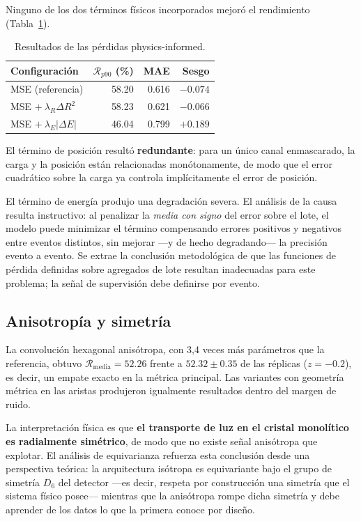 Ninguno de los dos términos físicos incorporados mejoró el rendimiento
(Tabla~\ref{tab:res-loss}).

\begin{table}[htbp]
\centering
\caption{Resultados de las pérdidas physics-informed.}
\label{tab:res-loss}
\begin{tabular}{lrrr}
\toprule
\textbf{Configuración} & $\mathcal{R}_{p90}$ (\%) & \textbf{MAE} & \textbf{Sesgo} \\
\midrule
MSE (referencia) & 58.20 & 0.616 & $-0.074$ \\
MSE $+\ \lambda_R \Delta R^2$ & 58.23 & 0.621 & $-0.066$ \\
MSE $+\ \lambda_E |\Delta E|$ & 46.04 & 0.799 & $+0.189$ \\
\bottomrule
\end{tabular}
\end{table}

El término de posición resultó \textbf{redundante}: para un único canal enmascarado, la carga y la
posición están relacionadas monótonamente, de modo que el error cuadrático sobre la carga ya
controla implícitamente el error de posición.

El término de energía produjo una degradación severa. El análisis de la causa resulta instructivo:
al penalizar la \emph{media con signo} del error sobre el lote, el modelo puede minimizar el término
compensando errores positivos y negativos entre eventos distintos, sin mejorar ---y de hecho
degradando--- la precisión evento a evento. Se extrae la conclusión metodológica de que las
funciones de pérdida definidas sobre agregados de lote resultan inadecuadas para este problema; la
señal de supervisión debe definirse por evento.

\subsection{Anisotropía y simetría}
\label{subsec:res-aniso}

La convolución hexagonal anisótropa, con 3,4 veces más parámetros que la referencia, obtuvo
$\mathcal{R}_{\text{media}} = 52.26$ frente a $52.32 \pm 0.35$ de las réplicas
($z = -0.2$), es decir, un empate exacto en la métrica principal. Las variantes con geometría
métrica en las aristas produjeron igualmente resultados dentro del margen de ruido.

La interpretación física es que \textbf{el transporte de luz en el cristal monolítico es
radialmente simétrico}, de modo que no existe señal anisótropa que explotar. El análisis de
equivarianza refuerza esta conclusión desde una perspectiva teórica: la arquitectura isótropa es
equivariante bajo el grupo de simetría $D_6$ del detector ---es decir, respeta por construcción una
simetría que el sistema físico posee--- mientras que la anisótropa rompe dicha simetría y debe
aprender de los datos lo que la primera conoce por diseño.

